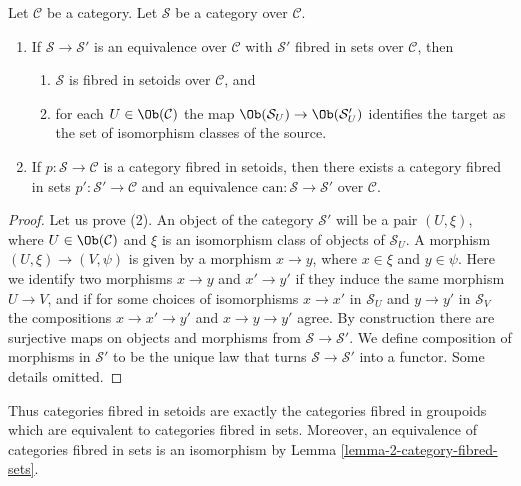 \begin{lemma}
\label{lemma-setoid-fibres}
Let $\mathcal{C}$ be a category. Let $\mathcal{S}$ be a category
over $\mathcal{C}$.
\begin{enumerate}
\item If $\mathcal{S} \to \mathcal{S}'$ is an equivalence
over $\mathcal{C}$ with $\mathcal{S}'$ fibred in sets over $\mathcal{C}$,
then
\begin{enumerate}
\item $\mathcal{S}$ is fibred in setoids over $\mathcal{C}$, and
\item for each $U \in \Ob(\mathcal{C})$ the map
$\Ob(\mathcal{S}_U) \to \Ob(\mathcal{S}'_U)$
identifies the target as the set of isomorphism classes of the source.
\end{enumerate}
\item If $p : \mathcal{S} \to \mathcal{C}$ is a category fibred in setoids,
then there exists a category fibred in sets
$p' : \mathcal{S}' \to \mathcal{C}$ and an equivalence
$\text{can} : \mathcal{S} \to \mathcal{S}'$ over $\mathcal{C}$.
\end{enumerate}
\end{lemma}

\begin{proof}
Let us prove (2).
An object of the category $\mathcal{S}'$ will be a pair $(U, \xi)$, where
$U \in \Ob(\mathcal{C})$ and $\xi$ is an isomorphism class of objects
of $\mathcal{S}_U$. A morphism $(U, \xi) \to (V , \psi)$ is given by a
morphism $x \to y$, where $x \in \xi$ and $y \in \psi$. Here we identify
two morphisms $x \to y$ and $x' \to y'$ if they induce the same morphism
$U \to V$, and if for some choices of isomorphisms $x \to x'$ in
$\mathcal{S}_U$ and $y \to y'$ in $\mathcal{S}_V$ the compositions
$x \to x' \to y'$ and $x \to y \to y'$ agree. By construction there are
surjective maps on objects and morphisms from $\mathcal{S} \to
\mathcal{S}'$. We define composition of morphisms in $\mathcal{S}'$ to
be the unique law that turns $\mathcal{S} \to \mathcal{S}'$ into a functor.
Some details omitted.
\end{proof}

\noindent
Thus categories fibred in setoids are exactly the categories fibred
in groupoids which are equivalent to categories fibred in sets.
Moreover, an equivalence of categories fibred in sets is an isomorphism
by Lemma \ref{lemma-2-category-fibred-sets}.

